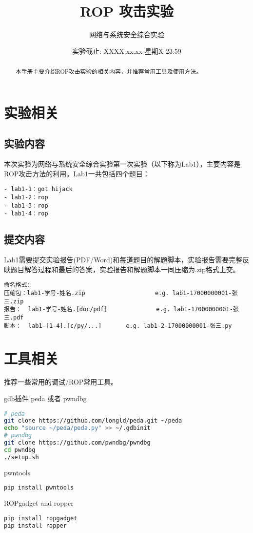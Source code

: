 \documentclass{labart}
\title{ROP 攻击实验}
\author{网络与系统安全综合实验}
\date{实验截止: XXXX.xx.xx 星期X 23:59}
\begin{document}
\maketitle


\begin{abstract}
本手册主要介绍ROP攻击实验的相关内容，并推荐常用工具及使用方法。
\end{abstract}


\section{实验相关}
\subsection{实验内容}
本次实验为网络与系统安全综合实验第一次实验（以下称为Lab1），主要内容是ROP攻击方法的利用。Lab1一共包括四个题目：
\begin{lstlisting}[numbers=none,frame=none]
- lab1-1：got hijack
- lab1-2：rop
- lab1-3：rop
- lab1-4：rop
\end{lstlisting}

\subsection{提交内容}
Lab1需要提交实验报告(PDF/Word)和每道题目的解题脚本，实验报告需要完整反映题目解答过程和最后的答案，实验报告和解题脚本一同压缩为.zip格式上交。

\begin{lstlisting}[numbers=none,frame=none]
命名格式:
压缩包：lab1-学号-姓名.zip                    e.g. lab1-17000000001-张三.zip
报告：  lab1-学号-姓名.[doc/pdf]              e.g. lab1-17000000001-张三.pdf
脚本：  lab1-[1-4].[c/py/...]       e.g. lab1-2-17000000001-张三.py
\end{lstlisting}


\section{工具相关}
\noindent 推荐一些常用的调试/ROP常用工具。

\vspace{0.5cm}

\noindent gdb插件 peda 或者 pwndbg

\begin{lstlisting}[numbers=none,frame=tb, language=bash]
# peda
git clone https://github.com/longld/peda.git ~/peda
echo "source ~/peda/peda.py" >> ~/.gdbinit
# pwndbg
git clone https://github.com/pwndbg/pwndbg
cd pwndbg
./setup.sh
\end{lstlisting}
\vspace{0.5cm}
\noindent pwntools
\begin{lstlisting}[numbers=none,frame=tb, language=bash]
pip install pwntools
\end{lstlisting}
\vspace{0.5cm}
\noindent ROPgadget and ropper
\begin{lstlisting}[numbers=none,frame=tb, language=bash]
pip install ropgadget
pip install ropper
\end{lstlisting}
\end{document}
